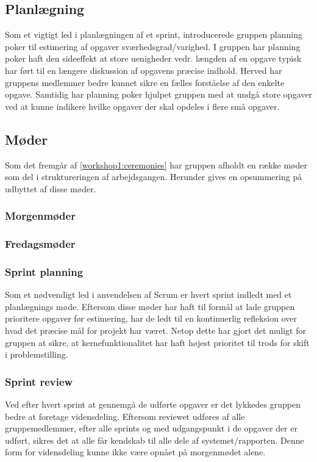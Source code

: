 \subsection{Planlægning}
Som et vigtigt led i planlægningen af et sprint, introducerede gruppen planning poker til estimering af opgaver sværhedsgrad/varighed.
I gruppen har planning poker haft den sideeffekt at store uenigheder vedr. længden af en opgave typisk har ført til en længere diskussion af opgavens præcise indhold.
Herved har gruppens medlemmer bedre kunnet sikre en fælles forståelse af den enkelte opgave.
Samtidig har planning poker hjulpet gruppen med at undgå store opgaver ved at kunne indikere hvilke opgaver der skal opdeles i flere små opgaver.

\subsection{Møder}
Som det fremgår af \cref{workshop1:ceremonies} har gruppen afholdt en række møder som del i struktureringen af arbejdsgangen.
Herunder gives en opsummering på udbyttet af disse møder.

\subsubsection{Morgenmøder}

\subsubsection{Fredagsmøder}\label{workshop3:fredag}

\subsubsection{Sprint planning}
Som et nødvendigt led i anvendelsen af Scrum er hvert sprint indledt med et planlægnings møde.
Eftersom disse møder har haft til formål at lade gruppen prioritere opgaver før estimering, har de ledt til en kontinuerlig refleksion over hvad det præcise mål for projekt har været.
Netop dette har gjort det muligt for gruppen at sikre, at kernefunktionalitet har haft højest prioritet til trods for skift i problemstilling.

\subsubsection{Sprint review}
Ved efter hvert sprint at gennemgå de udførte opgaver er det lykkedes gruppen bedre at foretage vidensdeling.
Eftersom reviewet udføres af alle gruppemedlemmer, efter alle sprints og med udgangspunkt i de opgaver der er udført, sikres det at alle får kendskab til alle dele af systemet/rapporten.
Denne form for vidensdeling kunne ikke være opnået på morgenmødet alene.
%
%
